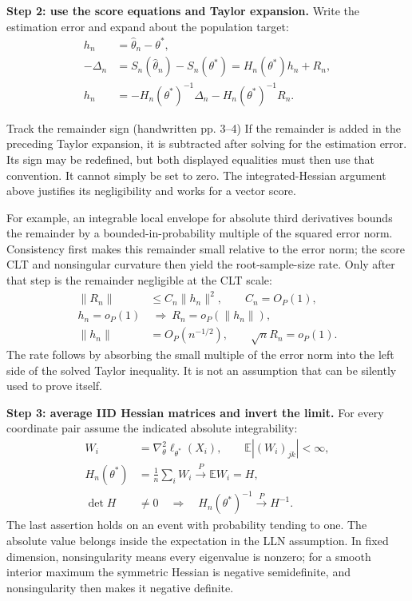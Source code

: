 \documentclass[12pt]{article}
\newcommand{\E}{\mathbb E}
\begin{document}
\textbf{Step 2: use the score equations and Taylor expansion.}
Write the estimation error and expand about the population target:
\begin{align}
 h_n&=\widehat\theta_n-\theta^*,\\
 -\Delta_n&=S_n(\widehat\theta_n)-S_n(\theta^*)
 =H_n(\theta^*)h_n+R_n,\\
 h_n&=-H_n(\theta^*)^{-1}\Delta_n
       -H_n(\theta^*)^{-1}R_n.
\end{align}
\begin{correctionbox}{Track the remainder sign (handwritten pp. 3--4)}
If the remainder is added in the preceding Taylor expansion, it is
subtracted after solving for the estimation error. Its sign may be
redefined, but both displayed equalities must then use that convention.
It cannot simply be set to zero. The integrated-Hessian argument above
justifies its negligibility and works for a vector score.
\end{correctionbox}
For example, an integrable local envelope for absolute third derivatives
bounds the remainder by a bounded-in-probability multiple of the squared
error norm. Consistency first makes this remainder small relative to the
error norm; the score CLT and nonsingular curvature then yield the
root-sample-size rate. Only after that step is the remainder negligible
at the CLT scale:
\begin{align}
 \|R_n\|&\le C_n\|h_n\|^2,\qquad C_n=O_P(1),\\
 h_n=o_P(1)&\ \Longrightarrow\ R_n=o_P(\|h_n\|),\\
 \|h_n\|&=O_P(n^{-1/2}),\qquad \sqrt n R_n=o_P(1).
\end{align}
The rate follows by absorbing the small multiple of the error norm into
the left side of the solved Taylor inequality. It is not an assumption
that can be silently used to prove itself.

\textbf{Step 3: average IID Hessian matrices and invert the limit.}
For every coordinate pair assume the indicated absolute integrability:
\begin{align}
 W_i&=\nabla_\theta^2\ell_{\theta^*}(X_i),\qquad
 \E |(W_i)_{jk}|<\infty,\\
 H_n(\theta^*)&=\frac1n\sum_iW_i\xrightarrow{P}\E W_i=H,\\
 \det H&\ne0\quad\Longrightarrow\quad
 H_n(\theta^*)^{-1}\xrightarrow{P}H^{-1}.
\end{align}
The last assertion holds on an event with probability tending to one.
The absolute value belongs inside the expectation in the LLN assumption.
In fixed dimension, nonsingularity means every eigenvalue is nonzero;
for a smooth interior maximum the symmetric Hessian is negative
semidefinite, and nonsingularity then makes it negative definite.
\end{document}
